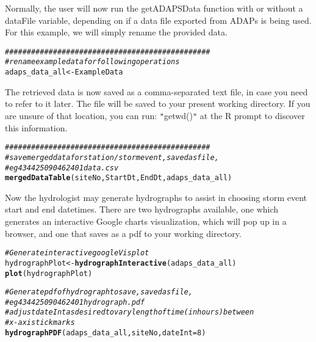 \documentclass[a4paper,11pt]{article}\usepackage[]{graphicx}\usepackage[]{color}
\makeatletter
\newcommand{\hlnum}[1]{\textcolor[rgb]{0.686,0.059,0.569}{#1}}%
\newcommand{\hlcom}[1]{\textcolor[rgb]{0.678,0.584,0.686}{\textit{#1}}}%
\newcommand{\hlstd}[1]{\textcolor[rgb]{0.345,0.345,0.345}{#1}}%
\newcommand{\hlkwb}[1]{\textcolor[rgb]{0.69,0.353,0.396}{#1}}%
\newcommand{\hlkwc}[1]{\textcolor[rgb]{0.333,0.667,0.333}{#1}}%
\newcommand{\hlkwd}[1]{\textcolor[rgb]{0.737,0.353,0.396}{\textbf{#1}}}%
\newenvironment{kframe}{%
 \def\at@end@of@kframe{}%
 \ifinner\ifhmode%
  \def\at@end@of@kframe{\end{minipage}}%
  \begin{minipage}{\columnwidth}%
 \fi\fi%
 \def\FrameCommand##1{\hskip\@totalleftmargin \hskip-\fboxsep
 \colorbox{shadecolor}{##1}\hskip-\fboxsep
     \hskip-\linewidth \hskip-\@totalleftmargin \hskip\columnwidth}%
 \MakeFramed {\advance\hsize-\width
   \@totalleftmargin\z@ \linewidth\hsize
   \@setminipage}}%
 {\par\unskip\endMakeFramed%
 \at@end@of@kframe}
\newenvironment{knitrout}{}{} %
\makeatother
\begin{document}
Normally, the user will now run the getADAPSData function with or without a dataFile variable, depending on if a data file exported from ADAPs is being used. For this example, we will simply rename the provided data.

\begin{knitrout}
\color{fgcolor}\begin{kframe}
\begin{alltt}
\hlcom{###############################################}
\hlcom{# rename example data for following operations}
\hlstd{adaps_data_all} \hlkwb{<-} \hlstd{ExampleData}
\end{alltt}
\end{kframe}
\end{knitrout}

The retrieved data is now saved as a comma-separated text file, in case you need to refer to it later. The file will be saved to your present working directory. If you are unsure of that location, you can run: \texttt{"}getwd()\texttt{"} at the R prompt to discover this information.

\begin{knitrout}
\color{fgcolor}\begin{kframe}
\begin{alltt}
\hlcom{###############################################}
\hlcom{# save merged data for station/storm event, saved as file, }
\hlcom{# eg 434425090462401data.csv }
\hlkwd{mergedDataTable}\hlstd{(siteNo,StartDt,EndDt,adaps_data_all)}
\end{alltt}
\end{kframe}
\end{knitrout}

Now the hydrologist may generate hydrographs to assist in choosing storm event start and end datetimes. There are two hydrographs available, one which generates an interactive Google charts visualization, which will pop up in a browser, and one that saves as a pdf to your working directory.

\begin{knitrout}
\color{fgcolor}\begin{kframe}
\begin{alltt}
\hlcom{# Generate interactive googleVis plot}
\hlstd{hydrographPlot} \hlkwb{<-} \hlkwd{hydrographInteractive}\hlstd{(adaps_data_all)}
\hlkwd{plot}\hlstd{(hydrographPlot)}

\hlcom{# Generate pdf of hydrograph to save, saved as file, }
\hlcom{# eg 434425090462401hydrograph.pdf }
\hlcom{# adjust dateInt as desired to vary length of time (in hours) between }
\hlcom{# x-axis tick marks}
\hlkwd{hydrographPDF}\hlstd{(adaps_data_all,siteNo,}\hlkwc{dateInt}\hlstd{=}\hlnum{8}\hlstd{)}
\end{alltt}
\end{kframe}
\end{knitrout}
\end{document}
